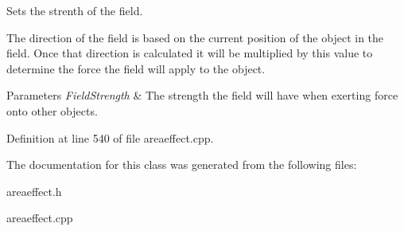 Sets the strenth of the field. 

The direction of the field is based on the current position of the object in the field. Once that direction is calculated it will be multiplied by this value to determine the force the field will apply to the object. 
\begin{DoxyParams}{Parameters}
{\em FieldStrength} & The strength the field will have when exerting force onto other objects. \\
\hline
\end{DoxyParams}


Definition at line 540 of file areaeffect.cpp.



The documentation for this class was generated from the following files:\begin{DoxyCompactItemize}
\item 
areaeffect.h\item 
areaeffect.cpp\end{DoxyCompactItemize}
